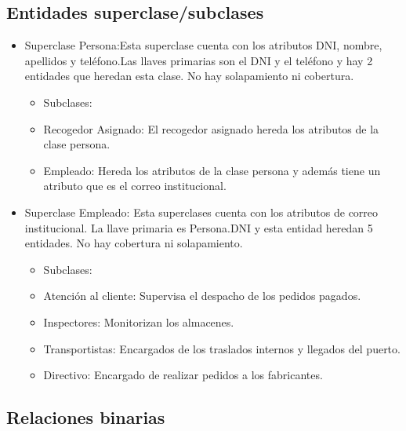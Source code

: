 \documentclass[10pt, a4paper,openany]{report}
\begin{document}
\subsection{Entidades superclase/subclases} %
\label{sub:Entidades superclase/subclases}
\begin{itemize}
	\item Superclase Persona:Esta superclase cuenta con los atributos DNI, nombre, apellidos y teléfono.Las llaves primarias son el DNI y el teléfono y hay 2 entidades que heredan esta clase. No hay solapamiento ni cobertura.
	      \begin{itemize}
		      \item Subclases:
		      \item Recogedor Asignado: El recogedor asignado hereda los atributos de la clase persona.
		      \item Empleado: Hereda los atributos de la clase persona y además tiene un atributo que es el correo institucional.
	      \end{itemize}
	\item Superclase Empleado: Esta superclases cuenta con los atributos de correo institucional. La llave primaria es Persona.DNI y esta entidad heredan 5 entidades. No hay cobertura ni solapamiento.
	      \begin{itemize}
		      \item Subclases:
		      \item Atención al cliente: Supervisa el despacho de los pedidos pagados.
		      \item Inspectores: Monitorizan los almacenes.
		      \item Transportistas: Encargados de los traslados internos y llegados del puerto.
		      \item Directivo: Encargado de realizar pedidos a los fabricantes.
	      \end{itemize}


\end{itemize}


\subsection{Relaciones binarias} %
\label{sub:Relaciones binarias}
\end{document}
